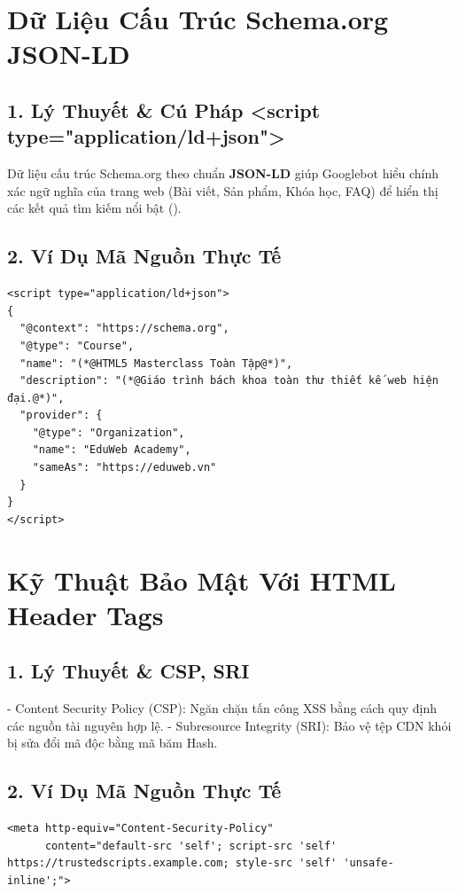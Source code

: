\section{Dữ Liệu Cấu Trúc Schema.org JSON-LD}
\subsection{1. Lý Thuyết \& Cú Pháp <script type="application/ld+json">}
Dữ liệu cấu trúc Schema.org theo chuẩn \textbf{JSON-LD} giúp Googlebot hiểu chính xác ngữ nghĩa của trang web (Bài viết, Sản phẩm, Khóa học, FAQ) để hiển thị các kết quả tìm kiếm nổi bật ().

\subsection{2. Ví Dụ Mã Nguồn Thực Tế}
\begin{lstlisting}[language=HTML5, caption={Ví dụ khai báo dữ liệu cấu trúc Khóa Học chuẩn Google Rich Results}]
<script type="application/ld+json">
{
  "@context": "https://schema.org",
  "@type": "Course",
  "name": "(*@HTML5 Masterclass Toàn Tập@*)",
  "description": "(*@Giáo trình bách khoa toàn thư thiết kế web hiện đại.@*)",
  "provider": {
    "@type": "Organization",
    "name": "EduWeb Academy",
    "sameAs": "https://eduweb.vn"
  }
}
</script>
\end{lstlisting}

\section{Kỹ Thuật Bảo Mật Với HTML Header Tags}
\subsection{1. Lý Thuyết \& CSP, SRI}
- Content Security Policy (CSP): Ngăn chặn tấn công XSS bằng cách quy định các nguồn tài nguyên hợp lệ.
- Subresource Integrity (SRI): Bảo vệ tệp CDN khỏi bị sửa đổi mã độc bằng mã băm Hash.

\subsection{2. Ví Dụ Mã Nguồn Thực Tế}
\begin{lstlisting}[language=HTML5, caption={Ví dụ cấu hình Content Security Policy trong thẻ meta}]
<meta http-equiv="Content-Security-Policy" 
      content="default-src 'self'; script-src 'self' https://trustedscripts.example.com; style-src 'self' 'unsafe-inline';">
\end{lstlisting}

